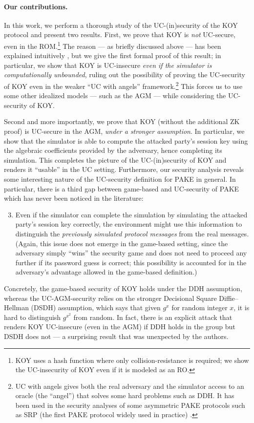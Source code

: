 \paragraph{Our contributions.}
In this work, we perform a thorough study of the UC-(in)security of the KOY protocol and present two results. First, we prove that KOY is \emph{not} UC-secure, even in the ROM.\footnote{KOY uses a hash function where only collision-resistance is required; we show the UC-insecurity of KOY even if it is modeled as an RO.} The reason  --- as briefly discussed above --- has been explained intuitively \cite[Section~3.3]{EC:CHKLM05}, but we give the first formal proof of this result; in particular, we show that KOY is UC-insecure \emph{even if the simulator is computationally unbounded}, ruling out the possibility of proving the UC-security of KOY even in the weaker ``UC with angels'' framework.\footnote{UC with angels \cite{STOC:PraSah04} gives both the real adversary and the simulator access to an oracle (the ``angel'') that solves some hard problems such as DDH. It has been used in the security analyses of some asymmetric PAKE protocols such as SRP (the first PAKE protocol widely used in practice) \cite{CSF:DayLeh24}.} This forces us to use some other idealized models --- such as the AGM --- while considering the UC-security of KOY.

Second and more importantly, we prove that KOY (without the additional ZK proof) is UC-secure in the AGM, \emph{under a stronger assumption}. In particular, we show that the simulator is able to compute the attacked party's session key using the algebraic coefficients provided by the adversary, hence completing its simulation. This completes the picture of the UC-(in)security of KOY and renders it ``usable'' in the UC setting. Furthermore, our security analysis reveals some interesting nature of the UC-security definition for PAKE in general. In particular, there is a third gap between game-based and UC-security of PAKE which has never been noticed in the literature:
\begin{enumerate}\setcounter{enumi}{2}
  \item Even if the simulator can complete the simulation by simulating the attacked party's session key correctly, the environment might use this information to distinguish the \emph{previously simulated protocol messages} from the real messages. (Again, this issue does not emerge in the game-based setting, since the adversary simply ``wins'' the security game and does not need to proceed any further if its password guess is correct; this possibility is accounted for in the adversary's advantage allowed in the game-based definition.)
\end{enumerate}
Concretely, the game-based security of KOY holds under the DDH assumption, whereas the UC-AGM-security relies on the stronger Decisional Square Diffie--Hellman (DSDH) assumption, which says that given $g^x$ for random integer $x$, it is hard to distinguish $g^{x^2}$ from random. In fact, there is an explicit attack that renders KOY UC-insecure (even in the AGM) if DDH holds in the group but DSDH does not --- a surprising result that was unexpected by the authors.

